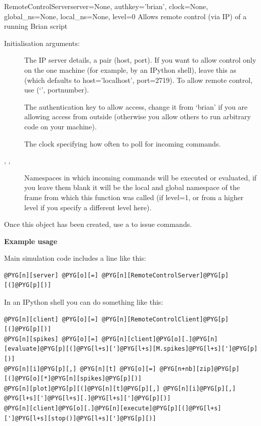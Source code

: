 \documentclass[letterpaper,10pt,english]{manual}
\begin{document}
\hypertarget{brian.RemoteControlServer}{}\begin{classdesc}{RemoteControlServer}{server=None, authkey='brian', clock=None, global\_ns=None, local\_ns=None, level=0}
Allows remote control (via IP) of a running Brian script

Initialisation arguments:
\begin{description}
\item[] \leavevmode
The IP server details, a pair (host, port). If you want to allow control
only on the one machine (for example, by an IPython shell), leave this
as  (which defaults to host='localhost', port=2719). To allow
remote control, use (`', portnumber).

\item[] \leavevmode
The authentication key to allow access, change it from `brian' if you
are allowing access from outside (otherwise you allow others to run
arbitrary code on your machine).

\item[] \leavevmode
The clock specifying how often to poll for incoming commands.

\item[, , ] \leavevmode
Namespaces in which incoming commands will be executed or evaluated,
if you leave them blank it will be the local and global namespace of
the frame from which this function was called (if level=1, or from
a higher level if you specify a different level here).

\end{description}

Once this object has been created, use a \hyperlink{brian.RemoteControlClient}{} to
issue commands.

\textbf{Example usage}

Main simulation code includes a line like this:

\begin{Verbatim}[commandchars=@\[\]]
@PYG[n][server] @PYG[o][=] @PYG[n][RemoteControlServer]@PYG[p][(]@PYG[p][)]
\end{Verbatim}

In an IPython shell you can do something like this:

\begin{Verbatim}[commandchars=@\[\]]
@PYG[n][client] @PYG[o][=] @PYG[n][RemoteControlClient]@PYG[p][(]@PYG[p][)]
@PYG[n][spikes] @PYG[o][=] @PYG[n][client]@PYG[o][.]@PYG[n][evaluate]@PYG[p][(]@PYG[l+s][']@PYG[l+s][M.spikes]@PYG[l+s][']@PYG[p][)]
@PYG[n][i]@PYG[p][,] @PYG[n][t] @PYG[o][=] @PYG[n+nb][zip]@PYG[p][(]@PYG[o][*]@PYG[n][spikes]@PYG[p][)]
@PYG[n][plot]@PYG[p][(]@PYG[n][t]@PYG[p][,] @PYG[n][i]@PYG[p][,] @PYG[l+s][']@PYG[l+s][.]@PYG[l+s][']@PYG[p][)]
@PYG[n][client]@PYG[o][.]@PYG[n][execute]@PYG[p][(]@PYG[l+s][']@PYG[l+s][stop()]@PYG[l+s][']@PYG[p][)]
\end{Verbatim}
\end{classdesc}
\end{document}

